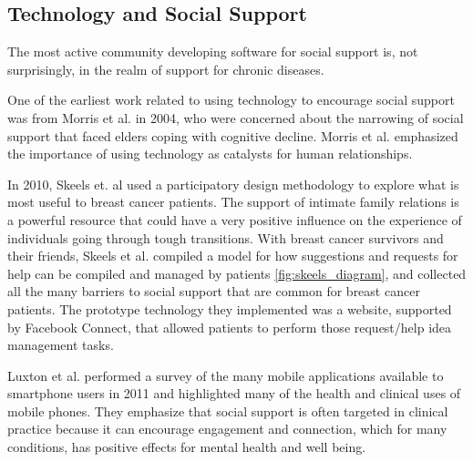   \subsection{Technology and Social Support}
    The most active community developing software for social support is,
    not surprisingly, in the realm of support for chronic diseases.

    One of the earliest work related to using technology to encourage social
    support was from Morris et al. in 2004,
    who were concerned about the narrowing of social support that faced
    elders coping with cognitive decline.
    Morris et al. emphasized the importance of using technology
    as catalysts for human relationships.
    \cite{morris04}

    In 2010, Skeels et. al used a participatory design methodology to explore what is most useful
    to breast cancer patients.
    \cite{skeels10}
    The support of intimate family relations is a powerful
    resource that could
    have a very positive influence on the experience of individuals going through
    tough transitions.
    With breast cancer survivors and their friends, Skeels et al. compiled a model for how
    suggestions and requests for help can be compiled and managed by patients \ref{fig:skeels_diagram},
    and collected all the many barriers to social support that are common for breast cancer patients.
    The prototype technology they implemented was a website, supported by Facebook Connect,
    that allowed patients to perform those request/help idea management tasks.

    Luxton et al. performed a survey of the many mobile applications available
    to smartphone users in 2011 and
    highlighted many of the health and clinical uses of mobile phones.
    They emphasize that social support is often targeted in clinical practice because
    it can encourage engagement and connection,
    which for many conditions, has positive effects for mental health and well being.
    \cite{luxton11}
